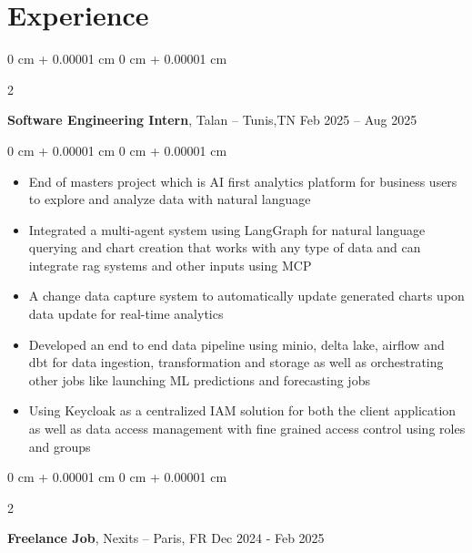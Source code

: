 \documentclass[10pt, letterpaper]{article}
\newenvironment{highlights}{
    \begin{itemize}[
        topsep=0.10 cm,
        parsep=0.10 cm,
        partopsep=0pt,
        itemsep=0pt,
        leftmargin=0 cm + 10pt
    ]
}{
    \end{itemize}
} %
\newenvironment{onecolentry}{
    \begin{adjustwidth}{
        0 cm + 0.00001 cm
    }{
        0 cm + 0.00001 cm
    }
}{
    \end{adjustwidth}
} %
\newenvironment{twocolentry}[2][]{
    \onecolentry
    \def\secondColumn{#2}
    \setcolumnwidth{\fill, 4.5 cm}
    \begin{paracol}{2}
}{
    \switchcolumn \raggedleft \secondColumn
    \end{paracol}
    \endonecolentry
} %
\begin{document}
    \section{Experience}



        
        \begin{twocolentry}{
            Feb 2025 – Aug 2025
        }
            \textbf{Software Engineering Intern}, Talan -- Tunis,TN\end{twocolentry}

        \vspace{0.10 cm}
        \begin{onecolentry}
            \begin{highlights}
                \item End of masters project which is AI first analytics platform for business users to explore and analyze data with natural language 
                \item Integrated a multi-agent system using LangGraph for natural language querying and chart creation that works with any type of data and can integrate rag systems and other inputs using MCP
                \item A change data capture system to automatically update generated charts upon data update for real-time analytics

                \item Developed an end to end data pipeline using minio, delta lake, airflow and dbt for data ingestion, transformation and storage as well as orchestrating other jobs like launching ML predictions and forecasting jobs 

                \item Using Keycloak as a centralized IAM solution for both the client application as well as data access management with fine grained access control using roles and groups
                \end{highlights}
        \end{onecolentry}


        \vspace{0.2 cm}

        \begin{twocolentry}{
            Dec 2024 - Feb 2025
        }
            \textbf{Freelance Job}, Nexits  -- Paris, FR\end{twocolentry}
\end{document}
